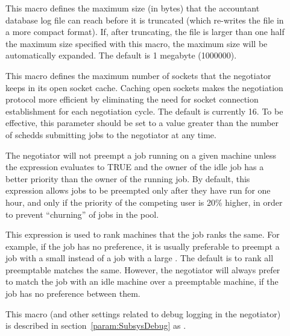 \begin{description}
\item[] 
  \label{param:MaxAccountantDatabaseSize}
  This macro defines the maximum size (in bytes) that the accountant
  database log file can reach before it is truncated (which re-writes
  the file in a more compact format).
  If, after truncating, the file is larger than one half the maximum
  size specified with this macro, the maximum size will be
  automatically expanded.
  The default is 1 megabyte (1000000).

\item[]
  \label{param:NegotiatorSocketCacheSize} This macro defines the
  maximum number of sockets that the negotiator keeps in its
  open socket cache.  Caching open sockets makes the negotiation
  protocol more efficient by eliminating the need for socket
  connection establishment for each negotiation cycle.  The default is
  currently 16.  To be effective, this parameter should be set to a
  value greater than the number of schedds submitting jobs to the
  negotiator at any time.

\item[]
  \label{param:PreemptionRequirements} The negotiator will not preempt
  a job running on a given machine unless the
   expression evaluates to TRUE and the
  owner of the idle job has a better priority than the owner of the
  running job.  By default, this expression allows jobs to be
  preempted only after they have run for one hour, and only if the
  priority of the competing user is 20\% higher, in order to prevent
  ``churning'' of jobs in the pool.

\item[] \label{param:PreemptionRank} This
  expression is used to rank machines that the job ranks the same.
  For example, if the job has no preference, it is usually preferable
  to preempt a job with a small  instead of a job with a
  large .  The default is to rank all preemptable matches the
  same.  However, the negotiator will always prefer to match the job
  with an idle machine over a preemptable machine, if the job has no
  preference between them.

\item[] \label{param:NegotiatorDebug} This macro
  (and other settings related to debug logging in the negotiator) is
  described in section~\ref{param:SubsysDebug} as .

\end{description}

